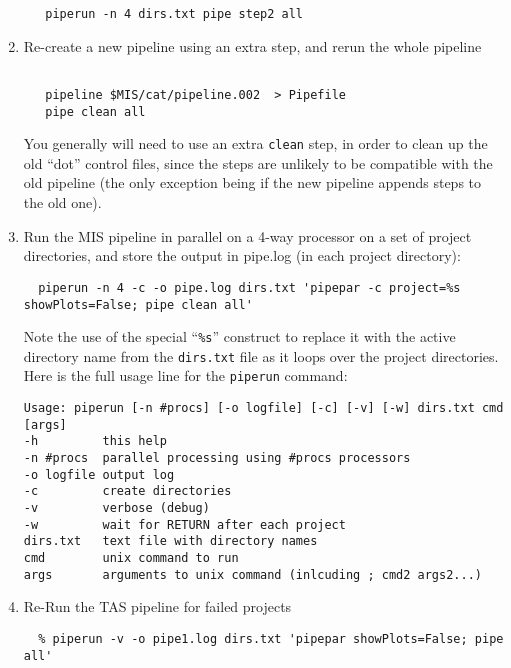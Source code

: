 \documentclass[preprint]{aastex} %
\begin{document}
\begin{enumerate}
\footnotesize
\begin{verbatim}
   piperun -n 4 dirs.txt pipe step2 all
\end{verbatim}
\normalsize


\item
Re-create a new pipeline using an extra step, and rerun the whole pipeline

\footnotesize
\begin{verbatim}

   pipeline $MIS/cat/pipeline.002  > Pipefile   
   pipe clean all
\end{verbatim}
\normalsize
You generally will need to use an extra {\tt clean} step, in order
to clean up the old ``dot'' control files, since the steps are unlikely
to be compatible with the old pipeline (the only exception being if
the new pipeline appends steps to the old one).

\item
Run the MIS pipeline in parallel on a 4-way processor
on a set of project directories, and store the
output in pipe.log (in each project directory):

\footnotesize
\begin{verbatim}
  piperun -n 4 -c -o pipe.log dirs.txt 'pipepar -c project=%s showPlots=False; pipe clean all'
\end{verbatim}
\normalsize

Note the use of the special ``{\tt \%s}'' construct to replace it with the active
directory name from the {\tt dirs.txt} file as it loops over the project directories.
Here is the full usage line for the {\tt piperun} command:

\footnotesize
\begin{verbatim}
Usage: piperun [-n #procs] [-o logfile] [-c] [-v] [-w] dirs.txt cmd [args]
-h         this help
-n #procs  parallel processing using #procs processors
-o logfile output log
-c         create directories
-v         verbose (debug)
-w         wait for RETURN after each project
dirs.txt   text file with directory names
cmd        unix command to run
args       arguments to unix command (inlcuding ; cmd2 args2...)
\end{verbatim}
\normalsize

%
\item
Re-Run the TAS pipeline for failed projects

\footnotesize
\begin{verbatim}
  % piperun -v -o pipe1.log dirs.txt 'pipepar showPlots=False; pipe all'
\end{verbatim}
\normalsize


\end{enumerate}
\end{document}
